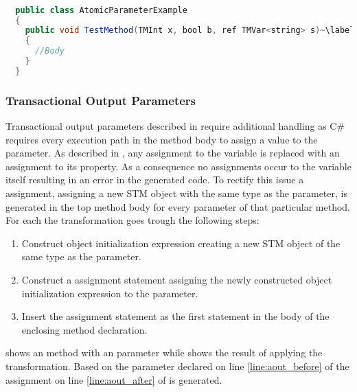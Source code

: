 \begin{lstlisting}[label=lst:after_atomic_parameter,
  caption={\bscode{atomic} Parameters After Transformation},
  language=Java,  
  showspaces=false,
  showtabs=false,
  breaklines=true,
  showstringspaces=false,
  breakatwhitespace=true,
  escapechar=~,
  commentstyle=\color{greencomments},
  keywordstyle=\color{bluekeywords},
  stringstyle=\color{redstrings},
  morekeywords={atomic, retry, orelse, var, get, set, ref}]  % Start your code-block

  public class AtomicParameterExample
  {
    public void TestMethod(TMInt x, bool b, ref TMVar<string> s)~\label{line:ap_after}~
    {
      //Body
    }
  }
\end{lstlisting}

\subsubsection{Transactional Output Parameters}
Transactional output parameters described in  require additional handling as C\# requires every execution path in the method body to assign a value to the parameter\cite[p. 42]{sestoft2011c}. As described in , any assignment to the variable is replaced with an assignment to its  property. As a consequence no assignments occur to the variable itself resulting in an error in the generated code. To rectify this issue a assignment, assigning a new \ac{STM} object with the same type as the parameter, is generated in the top method body for every  parameter of that particular method. For each  the transformation goes trough the following steps:

\begin{enumerate}
	\item Construct object initialization expression creating a new \ac{STM} object of the same type as the parameter.
	\item Construct a assignment statement assigning the newly constructed object initialization expression to the  parameter.
	\item Insert the assignment statement as the first statement in the body of the enclosing method declaration.
\end{enumerate}

 shows an method with an  parameter while  shows the result of applying the transformation.
Based on the  parameter declared on line \ref{line:aout_before} of  the assignment on line \ref{line:aout_after} of  is generated.

